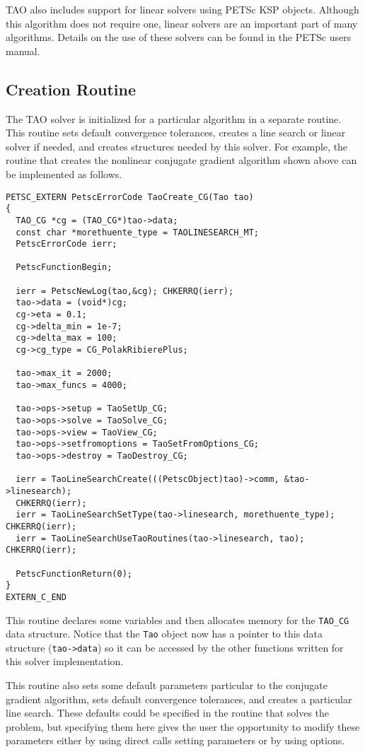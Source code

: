 TAO also includes support for linear solvers using PETSc KSP objects.  
Although this algorithm
does not require one, linear solvers are an important part of many
algorithms.  Details on the use of these solvers can be found in
the PETSc users manual.

\subsection{Creation Routine}
The TAO solver is initialized for a particular algorithm in a separate
routine.  This routine sets default convergence tolerances, creates a
line search or linear solver if needed, and creates structures needed
by this solver.   For example, the routine that creates the nonlinear
conjugate gradient algorithm shown above can be implemented as follows.

\begin{verbatim}
PETSC_EXTERN PetscErrorCode TaoCreate_CG(Tao tao)
{
  TAO_CG *cg = (TAO_CG*)tao->data;
  const char *morethuente_type = TAOLINESEARCH_MT;
  PetscErrorCode ierr;

  PetscFunctionBegin;

  ierr = PetscNewLog(tao,&cg); CHKERRQ(ierr);
  tao->data = (void*)cg;
  cg->eta = 0.1;
  cg->delta_min = 1e-7;
  cg->delta_max = 100;
  cg->cg_type = CG_PolakRibierePlus;

  tao->max_it = 2000;
  tao->max_funcs = 4000;

  tao->ops->setup = TaoSetUp_CG;
  tao->ops->solve = TaoSolve_CG;
  tao->ops->view = TaoView_CG;
  tao->ops->setfromoptions = TaoSetFromOptions_CG;
  tao->ops->destroy = TaoDestroy_CG;

  ierr = TaoLineSearchCreate(((PetscObject)tao)->comm, &tao->linesearch);
  CHKERRQ(ierr);
  ierr = TaoLineSearchSetType(tao->linesearch, morethuente_type); CHKERRQ(ierr);
  ierr = TaoLineSearchUseTaoRoutines(tao->linesearch, tao); CHKERRQ(ierr);

  PetscFunctionReturn(0);
}
EXTERN_C_END
\end{verbatim}

\noindent This routine declares some variables and then allocates memory for the 
{\tt TAO\_CG} data structure. Notice that the \texttt{Tao} object 
now has a pointer to this data structure (\texttt{tao->data}) so it can be 
accessed by the other functions written for this solver implementation.

This routine also sets some default parameters particular to the conjugate
gradient algorithm, sets default convergence tolerances, and creates
a particular line search.
These defaults could be specified in the routine that solves the problem,
but specifying them here gives the user the opportunity to modify these
parameters either by using direct calls setting parameters or by using options.

